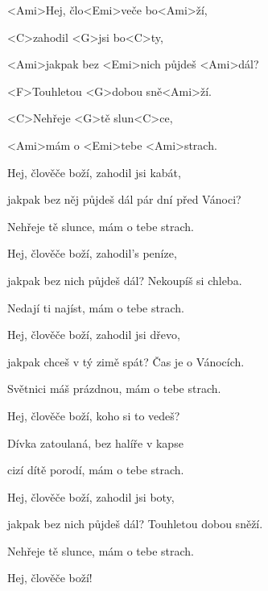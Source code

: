 

\zs
<Ami>Hej, člo<Emi>veče bo<Ami>ží,

<C>zahodil <G>jsi bo<C>ty,

<Ami>jakpak bez <Emi>nich půjdeš <Ami>dál?

<F>Touhletou <G>dobou sně<Ami>ží.

<C>Nehřeje <G>tě slun<C>ce,

<Ami>mám o <Emi>tebe <Ami>strach.
\ks

\zs
Hej, člověče boží, zahodil jsi kabát,

jakpak bez něj půjdeš dál pár dní před Vánoci?

Nehřeje tě slunce, mám o tebe strach.
\ks

\zs
Hej, člověče boží, zahodil's peníze,

jakpak bez nich půjdeš dál? Nekoupíš si chleba.

Nedají ti najíst, mám o tebe strach.
\ks

\zs
Hej, člověče boží, zahodil jsi dřevo,

jakpak chceš v tý zimě spát? Čas je o Vánocích.

Světnici máš prázdnou, mám o tebe strach.
\ks

\zs
Hej, člověče boží, koho si to vedeš?

Dívka zatoulaná, bez halíře v kapse

cizí dítě porodí, mám o tebe strach.
\ks

\zs
Hej, člověče boží, zahodil jsi boty,

jakpak bez nich půjdeš dál? Touhletou dobou sněží.

Nehřeje tě slunce, mám o tebe strach.
\ks

Hej, člověče boží!

\kp
